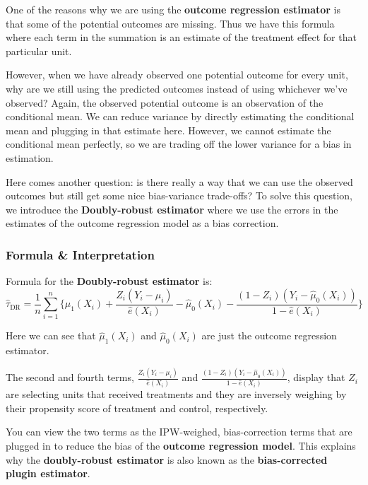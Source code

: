 One of the reasons why we are using the \textbf{outcome regression estimator} is that some of the potential outcomes are missing. Thus we have this formula where each term in the summation is an estimate of the treatment effect for that particular unit. 

However, when we have already observed one potential outcome for every unit, why are we still using the predicted outcomes instead of using whichever we've observed? Again, the observed potential outcome is an observation of the conditional mean. We can reduce variance by directly estimating the conditional mean and plugging in that estimate here. However, we cannot estimate the conditional mean perfectly, so we are trading off the lower variance for a bias in estimation.

Here comes another question: is there really a way that we can use the observed outcomes but still get some nice bias-variance trade-offs? To solve this question, we introduce the \textbf{Doubly-robust estimator} where we use the errors in the estimates of the outcome regression model as a bias correction.

\subsubsection{Formula \& Interpretation}
Formula for the \textbf{Doubly-robust estimator} is:
\begin{equation}
\hat{\tau}_{\text{DR}} = \frac{1}{n} \sum_{i=1}^{n} \{ 
\hat{\mu}_1\left(X_i\right) + \frac{Z_i\left(Y_i - \mu_i\right)}{\hat{e}\left(X_i\right)} - \hat{\mu}_0\left(X_i\right) - \frac{\left(1 - Z_i\right)\left(Y_i - \hat{\mu}_0\left(X_i\right)\right)}{1 - \hat{e}\left(X_i\right)}
\}
\end{equation}

Here we can see that $\hat{\mu}_1\left(X_i\right)$ and $\hat{\mu}_0\left(X_i\right)$ are just the outcome regression estimator. 

The second and fourth terms, $\frac{Z_i\left(Y_i - \mu_i\right)}{\hat{e}\left(X_i\right)}$ and $\frac{\left(1 - Z_i\right)\left(Y_i - \hat{\mu}_0\left(X_i\right)\right)}{1 - \hat{e}\left(X_i\right)}$, display that $Z_i$ are selecting units that received treatments and they are inversely weighing by their propensity score of treatment and control, respectively. 

You can view the two terms as the IPW-weighed, bias-correction terms that are plugged in to reduce the bias of the \textbf{outcome regression model}. This explains why the \textbf{doubly-robust estimator} is also known as the \textbf{bias-corrected plugin estimator}. 

